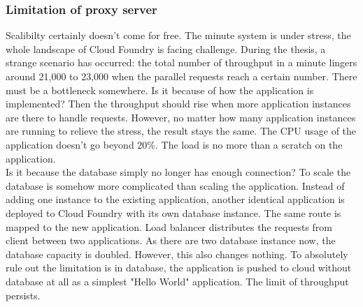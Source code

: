  \subsubsection{Limitation of proxy server}
 \label{haproxy}
Scalibilty certainly doesn't come for free. The minute system is under stress, the whole landscape of Cloud Foundry is facing challenge. During the thesis, a strange scenario has occurred: the total number of throughput in a minute lingers around 21,000 to 23,000 when the parallel requests reach a certain number. There must be a bottleneck somewhere. Is it because of how the application is implemented? Then the throughput should rise when more application instances are there to handle requests. However, no matter how many application instances are running to relieve the stress, the result stays the same.  The CPU usage of the application doesn't go beyond 20\%. The load is no more than a scratch on the application.\\
Is it because the database simply no longer has enough connection? To scale the database is somehow more complicated than scaling the application. Instead of adding one instance to the existing application, another identical application is deployed to Cloud Foundry with its own database instance. The same route is mapped to the new application. Load balancer distributes the requests from client between two applications. As there are two database instance now, the database capacity is doubled. However, this also changes nothing. To absolutely rule out the limitation is in database, the application is pushed to cloud without database at all as a simplest "Hello World" application. The limit of throughput persists. \\ 

